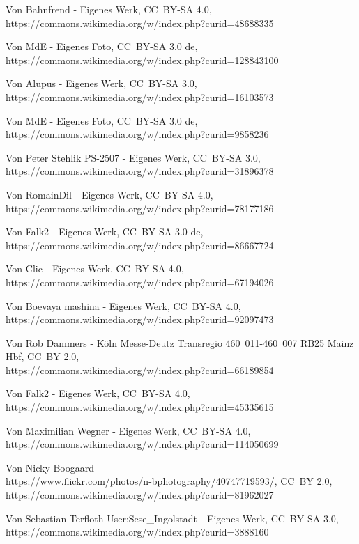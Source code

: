 \item[B1] Von Bahnfrend - Eigenes Werk, CC~BY-SA 4.0,\\
  https://commons.wikimedia.org/w/index.php?curid=48688335
\item[B3] Von MdE - Eigenes Foto, CC~BY-SA 3.0 de,\\
  https://commons.wikimedia.org/w/index.php?curid=128843100
\item[C3] Von Alupus - Eigenes Werk, CC~BY-SA 3.0,\\
  https://commons.wikimedia.org/w/index.php?curid=16103573
\item[D1] Von MdE - Eigenes Foto, CC~BY-SA 3.0 de,\\
   https://commons.wikimedia.org/w/index.php?curid=9858236
\item[D4] Von Peter Stehlik PS-2507 - Eigenes Werk, CC~BY-SA 3.0,\\
   https://commons.wikimedia.org/w/index.php?curid=31896378
\item[E1] Von RomainDil - Eigenes Werk, CC~BY-SA 4.0,\\
  https://commons.wikimedia.org/w/index.php?curid=78177186
\item[E2] Von Falk2 - Eigenes Werk, CC~BY-SA 3.0 de,\\
   https://commons.wikimedia.org/w/index.php?curid=86667724
\item[E3] Von Clic - Eigenes Werk, CC~BY-SA 4.0,\\
   https://commons.wikimedia.org/w/index.php?curid=67194026
 \item[E4] Von Boevaya mashina - Eigenes Werk, CC~BY-SA 4.0,\\
   https://commons.wikimedia.org/w/index.php?curid=92097473
\item[F2] Von Rob Dammers - Köln Messe-Deutz Transregio 460~011-460~007 RB25 Mainz Hbf, CC~BY 2.0,\\
  https://commons.wikimedia.org/w/index.php?curid=66189854
\item[F4] Von Falk2 - Eigenes Werk, CC~BY-SA 4.0,\\
  https://commons.wikimedia.org/w/index.php?curid=45335615
\item[G1] Von Maximilian Wegner - Eigenes Werk, CC~BY-SA 4.0,
  https://commons.wikimedia.org/w/index.php?curid=114050699
\item[G2] Von Nicky Boogaard -\\
  https://www.flickr.com/photos/n-bphotography/40747719593/, CC~BY 2.0,\\
  https://commons.wikimedia.org/w/index.php?curid=81962027
\item[H2] Von Sebastian Terfloth User:Sese\_Ingolstadt - Eigenes Werk, CC~BY-SA 3.0,\\
  https://commons.wikimedia.org/w/index.php?curid=3888160
